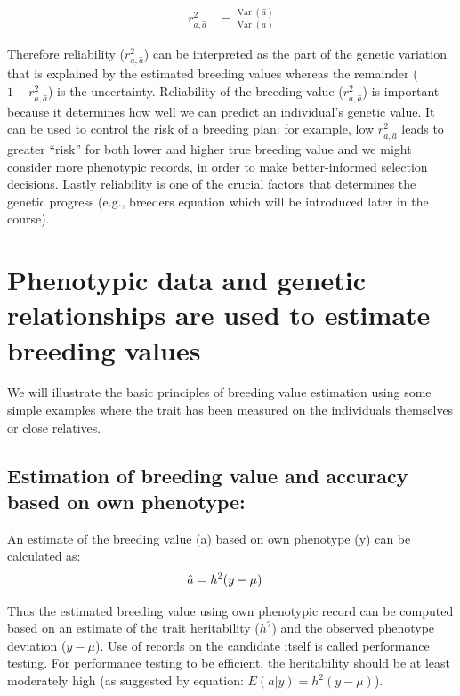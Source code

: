 \documentclass[
]{article}
\DeclareMathOperator{\Var}{Var}
\begin{document}
\begin{align}
            r_{a,\hat{a}}^2 &= \frac{\Var(\hat{a})}{\Var(a)}
\end{align}

Therefore reliability (\(r_{a,\hat{a}}^2\)) can be interpreted as the part of the genetic variation that is explained by the estimated breeding values whereas the remainder (\(1 - r_{a,\hat{a}}^2\)) is the uncertainty.
Reliability of the breeding value (\(r_{a,\hat{a}}^2\)) is important because it determines how well we can predict an individual's genetic value. It can be used to control the risk of a breeding plan: for example, low \(r_{a,\hat{a}}^2\) leads to greater ``risk'' for both lower and higher true breeding value and we might consider more phenotypic records, in order to make better-informed selection decisions. Lastly reliability is one of the crucial factors that determines the genetic progress (e.g., breeders equation which will be introduced later in the course).

\section{Phenotypic data and genetic relationships are used to estimate breeding values}\label{phenotypic-data-and-genetic-relationships-are-used-to-estimate-breeding-values}

We will illustrate the basic principles of breeding value estimation using some simple examples where the trait has been measured on the individuals themselves or close relatives.

\subsection{Estimation of breeding value and accuracy based on own phenotype:}\label{estimation-of-breeding-value-and-accuracy-based-on-own-phenotype}

An estimate of the breeding value (a) based on own phenotype (y) can be calculated as:
\begin{align}
\hat{a} &= h^2(y-\mu) \notag
\end{align}

Thus the estimated breeding value using own phenotypic record can be computed based on an estimate of the trait heritability (\(h^2\)) and the observed phenotype deviation (\(y-\mu\)). Use of records on the candidate itself is called performance testing. For performance testing to be efficient, the heritability should be at least moderately high (as suggested by equation: \(E(a|y) = h^2(y-\mu)\)).
\end{document}
